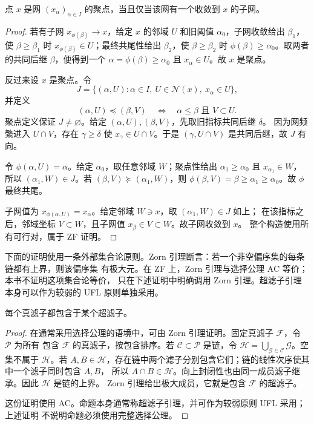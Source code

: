 \begin{theorem}[聚点--子网定理]\label{theorem:1-1-3-1}
点 \(x\) 是网 \((x_\alpha)_{\alpha\in I}\) 的聚点，当且仅当该网有一个收敛到 \(x\) 的子网。
\end{theorem}
\begin{proof}
若有子网 \(x_{\phi(\beta)}\to x\)，给定 \(x\) 的邻域 \(U\) 和旧阈值 \(\alpha_0\)，子网收敛给出
\(\beta_1\)，使 \(\beta\ge\beta_1\) 时 \(x_{\phi(\beta)}\in U\)；最终共尾性给出 \(\beta_2\)，使
\(\beta\ge\beta_2\) 时 \(\phi(\beta)\ge\alpha_0\)。取两者的共同后继 \(\beta\)，便得到一个
\(\alpha=\phi(\beta)\ge\alpha_0\) 且 \(x_\alpha\in U\)。故 \(x\) 是聚点。

反过来设 \(x\) 是聚点。令
\[
 J=\{(\alpha,U):\alpha\in I,\ U\in\mathcal N(x),\ x_\alpha\in U\},
\]
并定义
\[
 (\alpha,U)\preceq(\beta,V)
 \quad\Longleftrightarrow\quad
 \alpha\le\beta\text{ 且 }V\subset U.
\]
聚点定义保证 \(J\ne\varnothing\)。给定 \((\alpha,U),(\beta,V)\)，先取旧指标共同后继 \(\delta\)。
因为网频繁进入 \(U\cap V\)，存在 \(\gamma\ge\delta\) 使 \(x_\gamma\in U\cap V\)。于是
\((\gamma,U\cap V)\) 是共同后继，故 \(J\) 有向。

令 \(\phi(\alpha,U)=\alpha\)。给定 \(\alpha_0\)，取任意邻域 \(W\)；聚点性给出
\(\alpha_1\ge\alpha_0\) 且 \(x_{\alpha_1}\in W\)，所以 \((\alpha_1,W)\in J\)。若
\((\beta,V)\succeq(\alpha_1,W)\)，则 \(\phi(\beta,V)=\beta\ge\alpha_1\ge\alpha_0\)。故
\(\phi\) 最终共尾。

子网值为 \(x_{\phi(\alpha,U)}=x_\alpha\)。给定邻域 \(W\ni x\)，取 \((\alpha_1,W)\in J\) 如上；
在该指标之后，邻域坐标 \(V\subset W\)，且子网值 \(x_\beta\in V\subset W\)。故子网收敛到 \(x\)。
整个构造使用所有可行对，属于 \textsf{ZF} 证明。
\end{proof}

下面的证明使用一条外部集合论原则。Zorn 引理断言：若一个非空偏序集的每条链都有上界，则该偏序集
有极大元。在 \textsf{ZF} 上，Zorn 引理与选择公理 \textsf{AC} 等价；本书不证明这项集合论等价，
只在下述证明中明确调用 Zorn 引理。超滤子引理本身可以作为较弱的 \textsf{UFL} 原则单独采用。

\begin{theorem}[超滤子引理]\label{theorem:1-1-3-3}
每个真滤子都包含于某个超滤子。
\end{theorem}
\begin{proof}
在通常采用选择公理的语境中，可由 Zorn 引理证明。固定真滤子 \(\mathcal F\)，令 \(\mathscr P\) 为所有
包含 \(\mathcal F\) 的真滤子，按包含排序。若 \(\mathscr C\subset\mathscr P\) 是链，令
\(\mathcal H=\bigcup_{\mathcal G\in\mathscr C}\mathcal G\)。空集不属于 \(\mathcal H\)。若
\(A,B\in\mathcal H\)，存在链中两个滤子分别包含它们；链的线性次序使其中一个滤子同时包含 \(A,B\)，
所以 \(A\cap B\in\mathcal H\)。向上封闭性也由同一成员滤子继承。因此 \(\mathcal H\) 是链的上界。
Zorn 引理给出极大成员，它就是包含 \(\mathcal F\) 的超滤子。

这份证明使用 \textsf{AC}。命题本身通常称超滤子引理，并可作为较弱原则 \textsf{UFL} 采用；上述证明
不说明命题必须使用完整选择公理。
\end{proof}

